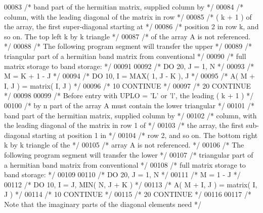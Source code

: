 \begin{DoxyCode}
00083 \textcolor{comment}{/*           band part of the hermitian matrix, supplied column by */}
00084 \textcolor{comment}{/*           column, with the leading diagonal of the matrix in row */}
00085 \textcolor{comment}{/*           ( k + 1 ) of the array, the first super-diagonal starting at */}
00086 \textcolor{comment}{/*           position 2 in row k, and so on. The top left k by k triangle */}
00087 \textcolor{comment}{/*           of the array A is not referenced. */}
00088 \textcolor{comment}{/*           The following program segment will transfer the upper */}
00089 \textcolor{comment}{/*           triangular part of a hermitian band matrix from conventional */}
00090 \textcolor{comment}{/*           full matrix storage to band storage: */}
00091 
00092 \textcolor{comment}{/*                 DO 20, J = 1, N */}
00093 \textcolor{comment}{/*                    M = K + 1 - J */}
00094 \textcolor{comment}{/*                    DO 10, I = MAX( 1, J - K ), J */}
00095 \textcolor{comment}{/*                       A( M + I, J ) = matrix( I, J ) */}
00096 \textcolor{comment}{/*              10    CONTINUE */}
00097 \textcolor{comment}{/*              20 CONTINUE */}
00098 
00099 \textcolor{comment}{/*           Before entry with UPLO = 'L' or 'l', the leading ( k + 1 ) */}
00100 \textcolor{comment}{/*           by n part of the array A must contain the lower triangular */}
00101 \textcolor{comment}{/*           band part of the hermitian matrix, supplied column by */}
00102 \textcolor{comment}{/*           column, with the leading diagonal of the matrix in row 1 of */}
00103 \textcolor{comment}{/*           the array, the first sub-diagonal starting at position 1 in */}
00104 \textcolor{comment}{/*           row 2, and so on. The bottom right k by k triangle of the */}
00105 \textcolor{comment}{/*           array A is not referenced. */}
00106 \textcolor{comment}{/*           The following program segment will transfer the lower */}
00107 \textcolor{comment}{/*           triangular part of a hermitian band matrix from conventional */}
00108 \textcolor{comment}{/*           full matrix storage to band storage: */}
00109 
00110 \textcolor{comment}{/*                 DO 20, J = 1, N */}
00111 \textcolor{comment}{/*                    M = 1 - J */}
00112 \textcolor{comment}{/*                    DO 10, I = J, MIN( N, J + K ) */}
00113 \textcolor{comment}{/*                       A( M + I, J ) = matrix( I, J ) */}
00114 \textcolor{comment}{/*              10    CONTINUE */}
00115 \textcolor{comment}{/*              20 CONTINUE */}
00116 
00117 \textcolor{comment}{/*           Note that the imaginary parts of the diagonal elements need */}

\end{DoxyCode}
